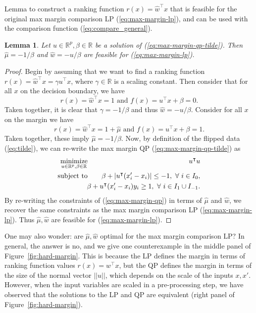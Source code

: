 \documentclass{article}
\newtheorem{lemma}{Lemma}
\newcommand{\RR}{\mathbb R}
\DeclareMathOperator*{\minimize}{minimize}
\begin{document}
Lemma to construct a ranking function $r(x)= \hat w^\intercal x$
that is feasible for the original max margin comparison LP
(\ref{eq:max-margin-lp}), and can be used with the comparison function
(\ref{eq:compare_general}).
\begin{lemma}
  Let $u\in\RR^p,\beta\in\RR$ be a solution of
  (\ref{eq:max-margin-qp-tilde}). Then $\hat \mu = -1/\beta$
  and $\hat w = -u/\beta$ are feasible for
  (\ref{eq:max-margin-lp}).
  \label{lemma:feasible}
\end{lemma}
\begin{proof}
  Begin by assuming that we want to find a ranking function $r(x)=\hat
  w^\intercal x = \gamma u^\intercal x$, where $\gamma\in\RR$ is a
  scaling constant.  
  Then consider that for all $x$ on the decision
  boundary, we have
  \begin{equation}
    \label{eq:dec-boundary-rank}
    r(x) = \hat w^\intercal x = 1\text{ and } f(x)=u^\intercal x + \beta = 0.
  \end{equation}
  Taken together, it is clear that $\gamma=-1/\beta$ and thus $\hat w
  = -u/\beta$. Consider for all $x$ on the margin we have 
  \begin{equation}
    \label{eq:margin-rank}
    r(x) = \hat w^\intercal x = 1+\hat\mu\text{ and } f(x)=u^\intercal x + \beta= 1.
  \end{equation}
  Taken together, these imply $\hat \mu=-1/\beta$. Now, by definition
  of the flipped data (\ref{eq:tilde}), we can re-write the max margin
  QP (\ref{eq:max-margin-qp-tilde}) as
\begin{eqnarray}
  \label{eq:max-margin-qp}
    \minimize_{u\in\RR^p, \beta\in\RR}\ &&\hskip -0.5cm u^\intercal u  \\
    \text{subject to}\ &&\hskip -0.5cm
    \nonumber \beta + |u^\intercal (x_i'-x_i)| \leq -1,\
    \forall\  i\in I_0,\\
    &&\hskip -0.5cm
\nonumber \beta + u^\intercal(x_i'-x_i)y_i \geq 1,\ \forall\ i\in I_1\cup I_{-1}.
\end{eqnarray}
By re-writing the constraints of (\ref{eq:max-margin-qp}) in terms of
$\hat \mu$ and $\hat w$, we recover the same constraints as the max
margin comparison LP (\ref{eq:max-margin-lp}). Thus $\hat \mu, \hat w$
are feasible for (\ref{eq:max-margin-lp}).
\end{proof}

One may also wonder: are $\hat \mu,\hat w$ optimal for the max margin
comparison LP? In general, the answer is no, and we give one
counterexample in the middle panel of
Figure~\ref{fig:hard-margin}. This is because the LP defines the
margin in terms of ranking function values $r(x)=w^\intercal x$, but
the QP defines the margin in terms of the size of the normal vector
$||u||$, which depends on the scale of the inputs $x,x'$. However,
when the input variables are scaled in a pre-processing step, we have
observed that the solutions to the LP and QP are equivalent (right
panel of Figure~\ref{fig:hard-margin}).
\end{document}
